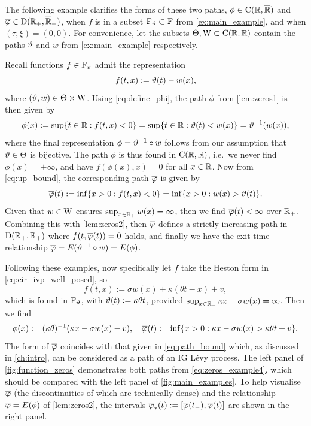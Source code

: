 The following example clarifies the forms of these two paths, $\phi\in\mathrm{C}(\mathbb{R},{\overline{\mathbb{R}}})$ and $\overline{\varphi}\in\mathrm{D}(\mathbb{R}_+,{\overline{\mathbb{R}}}_+)$, when $f$ is in a subset $\mathrm{F}_\vartheta\subset\mathrm{F}$ from \autoref{ex:main_example}, and when $(\tau,\xi)=(0,0)$. For convenience, let the subsets $\Theta,\mathrm{W}\subset\mathrm{C}(\mathbb{R},\mathbb{R})$ contain the paths $\vartheta$ and $w$ from \autoref{ex:main_example} respectively.

\begin{example}\label{ex:zeros_example}
    Recall functions $f\in\mathrm{F}_\vartheta$ admit the representation
    \begin{equation}
        f(t,x) := \vartheta(t) - w(x),
    \end{equation}
    where $(\vartheta,w)\in\Theta\times\mathrm{W}$. Using \autoref{eq:define_phi}, the path $\phi$ from \autoref{lem:zeros1} is then given by
    \begin{equation}
        \phi(x) := \sup\{t\in\mathbb{R}: f(t,x) <0 \} = \sup\{t\in\mathbb{R}: \vartheta(t) < w(x) \} = \vartheta^{-1}(w(x)),
    \end{equation}
    where the final representation $\phi=\vartheta^{-1}\circ w$ follows from our assumption that $\vartheta\in\Theta$ is bijective. The path $\phi$ is thus found in $\mathrm{C}(\mathbb{R},\mathbb{R})$, i.e.~we never find $\phi(x)=\pm\infty$, and have $f(\phi(x),x)=0$ for all $x\in\mathbb{R}$. Now from \autoref{eq:up_bound}, the corresponding path $\overline{\varphi}$ is given by
    \begin{equation}
        \overline{\varphi}(t):= \inf\{x>0:f(t,x)<0\} = \inf\{x>0:w(x)>\vartheta(t)\}.
    \end{equation}
    Given that $w\in\mathrm{W}$ ensures $\sup_{x\in\mathbb{R}_+}w(x)=\infty$, then we find $\overline{\varphi}(t)<\infty$ over $\mathbb{R}_+$. Combining this with \autoref{lem:zeros2}, then $\overline{\varphi}$ defines a strictly increasing path in $\mathrm{D}(\mathbb{R}_+,\mathbb{R}_+)$ where $f(t,\overline{\varphi}(t))=0$ holds, and finally we have the exit-time relationship $\overline{\varphi} = E(\vartheta^{-1}\circ w)=E(\phi)$.
\end{example}

Following these examples, now specifically let $f$ take the Heston form in \autoref{eq:cir_ivp_well_posed}, so
\begin{equation}
    f(t,x) := \sigma w(x) + \kappa(\theta t - x) + v,
\end{equation}
which is found in $\mathrm{F}_\vartheta$, with $\vartheta(t):=\kappa\theta t$, provided $\sup_{x\in\mathbb{R}_+}\kappa x - \sigma w(x)=\infty$. Then we find
\begin{equation}\label{eq:zeros_example4}
    \phi(x) := (\kappa\theta)^{-1}(\kappa x - \sigma w(x) - v),\quad \overline{\varphi}(t):=\inf\{x>0: \kappa x - \sigma w(x) > \kappa\theta t + v\}.
\end{equation}
The form of $\overline{\varphi}$ coincides with that given in \autoref{eq:path_bound} which, as discussed in \autoref{ch:intro}, can be considered as a path of an IG L\'evy process. The left panel of \autoref{fig:function_zeros} demonstrates both paths from \autoref{eq:zeros_example4}, which should be compared with the left panel of \autoref{fig:main_examples}. To help visualise $\overline{\varphi}$ (the discontinuities of which are technically dense) and the relationship $\overline{\varphi}=E(\phi)$ of \autoref{lem:zeros2}, the intervals $\overline{\varphi}_*(t):=[\overline{\varphi}(t_-),\overline{\varphi}(t)]$ are shown in the right panel.

